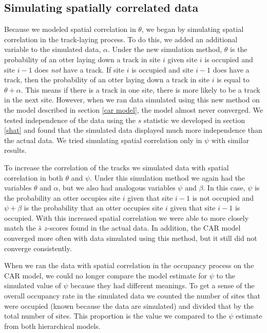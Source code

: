 \documentclass[12pt]{article}
\begin{document}
    \subsection{Simulating spatially correlated data}
    Because we modeled spatial correlation in $\theta$, we began by simulating
    spatial correlation in the track-laying process. To do this, we added an
    additional variable to the simulated data, $\alpha$. Under the new
    simulation method, $\theta$ is the probability of an otter laying down a
    track in site $i$ given site $i$ is occupied and site $i-1$ does
    \textit{not} have a track. If site $i$ is occupied and site $i-1$ does have
    a track, then the probability of an otter laying down a track in site $i$ is
    equal to $\theta+\alpha$. This means if there is a track in one site, there
    is more likely to be a track in the next site. However, when we ran data
    simulated using this new method on the model described in section \ref{car
    model}, the model almost never converged. We tested independence of the data
    using the $\hat{s}$ statistic we developed in section \ref{shat} and found
    that the simulated data displayed much more independence than the actual
    data. We tried simulating spatial correlation only in $\psi$ with similar
    results.

    To increase the correlation of the tracks we simulated data with spatial
    correlation in both $\theta$ and $\psi$. Under this simulation method we
    again had the variables $\theta$ and $\alpha$, but we also had analogous
    variables $ \psi$ and $\beta$. In this case, $\psi$ is the probability an
    otter occupies site $i$ given that site $i-1$ is not occupied and $\psi+
    \beta$ is the probability that an otter occupies site $i$ given that site
    $i-1$ is occupied. With this increased spatial correlation we were able to
    more closely match the $\hat{s}$ $z$-scores found in the actual data. In
    addition, the CAR model converged more often with data simulated using this
    method, but it still did not converge consistently.

    When we ran the data with spatial correlation in the occupancy process on
    the CAR model, we could no longer compare the model estimate for $\psi$ to
    the simulated value of $\psi$ because they had different meanings. To get a
    sense of the overall occupancy rate in the simulated data we counted the
    number of sites that were occupied (known because the data are simulated)
    and divided that by the total number of sites. This proportion is the value
    we compared to the $\psi$ estimate from both hierarchical models.
\end{document}
